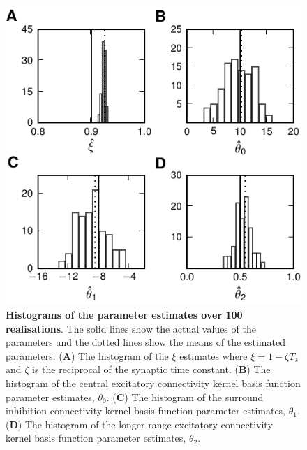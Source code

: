 \documentclass[10pt]{article}
\begin{document}
\begin{figure}[!ht]
\begin{center}
\includegraphics{./Graph/pdf/Figure7.pdf}
\end{center}
\caption{{\bf Histograms of the parameter estimates over 100
realisations}. The solid lines show the actual values of the parameters and the dotted lines show the means of the estimated parameters. (\textbf{A}) The histogram of the $\xi$ estimates where $\xi=1-\zeta T_s $ and $\zeta$ is the reciprocal of the synaptic time constant. (\textbf{B}) The histogram of the central excitatory connectivity kernel basis function parameter estimates, $\theta_0$. (\textbf{C}) The histogram of the surround inhibition connectivity kernel basis function parameter estimates, $\theta_1$. (\textbf{D}) The histogram of the longer range excitatory connectivity kernel basis function parameter estimates, $\theta_2$.}
\label{fig:Parameters}
\end{figure}
\end{document}
